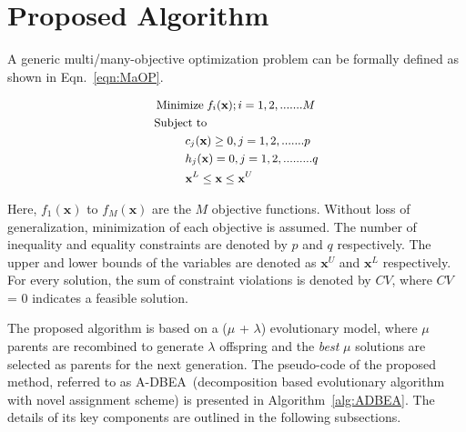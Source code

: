 \section{Proposed Algorithm}
\label{sec:algo}

A generic multi/many-objective optimization problem can be formally defined as shown in Eqn.~\ref{eqn:MaOP}.

\begin{equation}\small
\begin{aligned}
\operatorname{Minimize}\; & f_i(\textbf{x}); i=1,2,.......M \\
\text{Subject to} & \\
& \hspace{-0.6cm}c_j(\textbf{x})\ge 0, j=1,2,.......p  \\ 
& \hspace{-0.6cm}h_j(\textbf{x}) = 0, j=1,2,.........q  \\ 
& \hspace{-0.6cm}\textbf{x}^{L}\le\textbf{x}\le\textbf{x}^{U}\\ 
\label{eqn:MaOP}
\end{aligned}
\end{equation}

\noindent Here, $f_1(\textbf{x})$  to $f_M(\textbf{x})$ are the $M$ objective functions. Without loss of generalization, minimization of each objective is assumed. The number of inequality and equality constraints are denoted by $p$ and $q$ respectively. The upper and lower bounds of the variables are denoted as $\textbf{x}^{U}$ and $\textbf{x}^{L}$ respectively. For every solution, the sum of constraint violations is denoted by $CV$, where $CV$ = $0$ indicates a feasible solution.

The proposed algorithm is based on a ($\mu$ + $\lambda$) evolutionary model, where $\mu$ parents are recombined to generate $\lambda$ offspring and the \textit{best} $\mu$ solutions are selected as parents for the next generation. The pseudo-code of the proposed method, referred to as A-DBEA~(decomposition based evolutionary algorithm with novel assignment scheme) is presented in Algorithm~\ref{alg:ADBEA}. The details of its key components are outlined in the following subsections.

